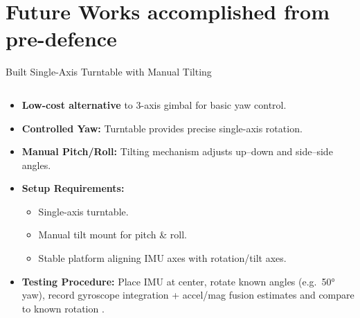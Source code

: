 \documentclass[aspectratio=169,xcolor=dvipsnames]{beamer}
\begin{document}
\section{Future Works accomplished from pre-defence}

\begin{frame}{Built Single-Axis Turntable with Manual Tilting}
\scriptsize
\begin{columns}[T]
  \begin{column}{0.5\textwidth}
    \begin{itemize}
      \item \textbf{Low-cost alternative} to 3-axis gimbal for basic yaw control.
      \item \textbf{Controlled Yaw:} Turntable provides precise single-axis rotation.
      \item \textbf{Manual Pitch/Roll:} Tilting mechanism adjusts up–down and side–side angles.
      \item \textbf{Setup Requirements:}
        \begin{itemize}
          \item Single-axis turntable.
          \item Manual tilt mount for pitch & roll.
          \item Stable platform aligning IMU axes with rotation/tilt axes.
        \end{itemize}
      \item \textbf{Testing Procedure:}
        Place IMU at center, rotate known angles (e.g.\ 50° yaw), record gyroscope integration + accel/mag fusion estimates and compare to known rotation \cite{angle_sar}.
    \end{itemize}
  \end{column}
  

\end{columns}
\end{frame}
\end{document}
